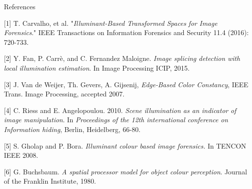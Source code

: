 \begin{tframe}{References}

\begin{footnotesize}

[1] T. Carvalho, et al. "\emph{Illuminant-Based Transformed Spaces for Image Forensics}." IEEE Transactions on Information Forensics and Security 11.4 (2016): 720-733.

\vspace{0.1in}

[2] Y. Fan, P. Carrè, and C. Fernandez Maloigne. \emph{Image splicing detection with local illumination estimation}. In Image Processing ICIP, 2015.

\vspace{0.1in}

[3] J. Van de Weijer, Th. Gevers, A. Gijsenij, \emph{Edge-Based Color Constancy}, IEEE Trans. Image Processing, accepted 2007. 

\vspace{0.1in}

[4] C. Riess and E. Angelopoulou. 2010. \emph{Scene illumination as an indicator of image manipulation}. In \emph{Proceedings of the 12th international conference on Information hiding}, Berlin, Heidelberg, 66-80.

\vspace{0.1in}

[5] S. Gholap and P. Bora. \emph{Illuminant colour based image forensics.} In TENCON IEEE 2008.

\vspace{0.1in}
[6] G. Buchsbaum. \emph{A spatial processor model for object colour perception}. Journal of the Franklin Institute, 1980.

\end{footnotesize}

\end{tframe}